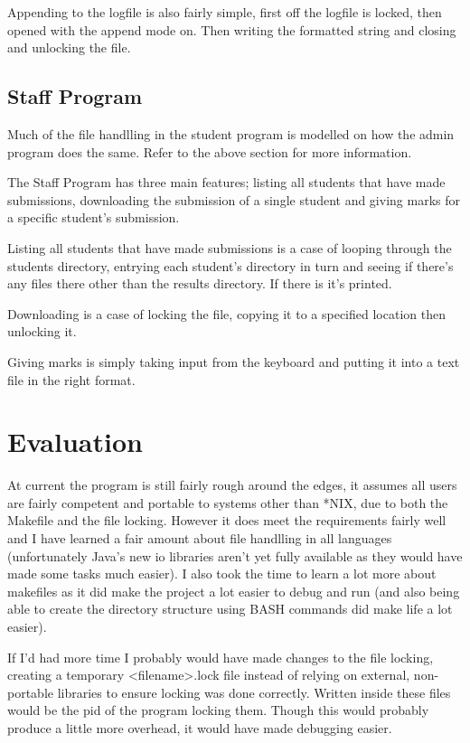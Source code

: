 \documentclass[10pt,letterpaper]{article}
\begin{document}
				Appending to the logfile is also fairly simple, first off the logfile is locked, then opened with the append mode on. Then writing the formatted string and closing and unlocking the file.

			\subsection{Staff Program}
                                Much of the file handlling in the student program is modelled on how the admin program does the same. Refer to the above section for more information.

				The Staff Program has three main features; listing all students that have made submissions, downloading the submission of a single student and giving marks for a specific student's submission.

				Listing all students that have made submissions is a case of looping through the students directory, entrying each student's directory in turn and seeing if there's any files there other than the results directory. If there is it's printed.

				Downloading is a case of locking the file, copying it to a specified location then unlocking it.

				Giving marks is simply taking input from the keyboard and putting it into a text file in the right format.

		\section{Evaluation}
			At current the program is still fairly rough around the edges, it assumes all users are fairly competent and portable to systems other than *NIX, due to both the Makefile and the file locking. However it does meet the requirements fairly well and I have learned a fair amount about file handlling in all languages (unfortunately Java's new io libraries aren't yet fully available as they would have made some tasks much easier). I also took the time to learn a lot more about makefiles as it did make the project a lot easier to debug and run (and also being able to create the directory structure using BASH commands did make life a lot easier).

			If I'd had more time I probably would have made changes to the file locking, creating a temporary <filename>.lock file instead of relying on external, non-portable libraries to ensure locking was done correctly. Written inside these files would be the pid of the program locking them. Though this would probably produce a little more overhead, it would have made debugging easier.
\end{document}
